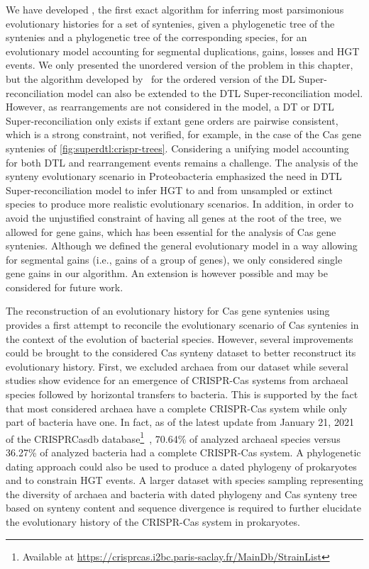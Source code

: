 We have developed {\superdtl}, the first exact algorithm for inferring most parsimonious evolutionary histories for a set of syntenies, given a phylogenetic tree of the syntenies and a phylogenetic tree of the corresponding species, for an evolutionary model accounting for segmental duplications, gains, losses and HGT events.
We only presented the unordered version of the problem in this chapter, but the algorithm developed by~\textcite{Delabre2020EvolutionSegmentalDuplications} for the ordered version of the DL Super-reconciliation model can also be extended to the DTL Super-reconciliation model.
However, as rearrangements are not considered in the model, a DT or DTL Super-reconciliation only exists if extant gene orders are pairwise consistent, which is a strong constraint, not verified, for example, in the case of the Cas gene syntenies of \cref{fig:superdtl:crispr-trees}.
Considering a unifying model accounting for both DTL and rearrangement events remains a challenge.
The analysis of the synteny evolutionary scenario in Proteobacteria emphasized the need in DTL Super-reconciliation model to infer HGT to and from unsampled or extinct species to produce more realistic evolutionary scenarios.
In addition, in order to avoid the unjustified constraint of having all genes at the root of the tree, we allowed for gene gains, which has been essential for the analysis of Cas gene syntenies.
Although we defined the general evolutionary model in a way allowing for segmental gains (i.e., gains of a group of genes), we only considered single gene gains in our algorithm.
An extension is however possible and may be considered for future work.

The reconstruction of an evolutionary history for Cas gene syntenies using {\superdtl} provides a first attempt to reconcile the evolutionary scenario of Cas syntenies in the context of the evolution of bacterial species.
However, several improvements could be brought to the considered Cas synteny dataset to better reconstruct its evolutionary history.
First, we excluded archaea from our dataset while several studies show evidence for an emergence of CRISPR-Cas systems from archaeal species followed by horizontal transfers to bacteria.
This is supported by the fact that most considered archaea have a complete CRISPR-Cas system while only part of bacteria have one.
In fact, as of the latest update from January 21, 2021 of the CRISPRCasdb database\footnote{Available at \url{https://crisprcas.i2bc.paris-saclay.fr/MainDb/StrainList}}~\parencite{Pourcel2020CRISPRCasdbSuccessorCRISPRdb}, 70.64\% of analyzed archaeal species versus 36.27\% of analyzed bacteria had a complete CRISPR-Cas system.
A phylogenetic dating approach could also be used to produce a dated phylogeny of prokaryotes and to constrain HGT events.
A larger dataset with species sampling representing the diversity of archaea and bacteria with dated phylogeny and Cas synteny tree based on synteny content and sequence divergence is required to further elucidate the evolutionary history of the CRISPR-Cas system in prokaryotes.
